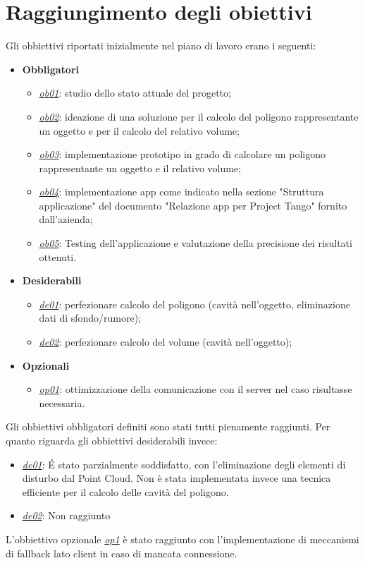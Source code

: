 \newpage
\section{Raggiungimento degli obiettivi}
Gli obbiettivi riportati inizialmente nel piano di lavoro erano i seguenti:
\begin{itemize}
	\item \textbf{Obbligatori}
	\begin{itemize}
		\item \underline{\textit{ob01}}: studio dello stato attuale del progetto;
		\item \underline{\textit{ob02}}: ideazione di una soluzione per il calcolo del poligono rappresentante un oggetto e per il calcolo del relativo volume;
		\item \underline{\textit{ob03}}: implementazione prototipo in grado di calcolare un poligono rappresentante un oggetto e il relativo volume;
		\item \underline{\textit{ob04}}: implementazione app come indicato nella sezione "Struttura applicazione" del documento "Relazione app per Project Tango" fornito dall’azienda;
		\item \underline{\textit{ob05}}: Testing dell’applicazione e valutazione della precisione dei risultati ottenuti.
	\end{itemize}
	
	\item \textbf{Desiderabili}
	\begin{itemize}
		\item \underline{\textit{de01}}: perfezionare calcolo del poligono (cavità nell’oggetto, eliminazione dati di sfondo/rumore);
		\item \underline{\textit{de02}}: perfezionare calcolo del volume (cavità nell’oggetto);
	\end{itemize}
	
	\item \textbf{Opzionali}
	\begin{itemize}
		\item \underline{\textit{op01}}: ottimizzazione della comunicazione con il server nel caso risultasse necessaria.
	\end{itemize} 
\end{itemize}
\noindent 
Gli obbiettivi obbligatori definiti sono stati tutti pienamente raggiunti.
Per quanto riguarda gli obbiettivi desiderabili invece:
\begin{itemize}
	\item \underline{\textit{de01}}: \'E stato parzialmente soddisfatto, con l'eliminazione degli elementi di disturbo dal Point Cloud. Non è stata implementata invece una tecnica efficiente per il calcolo delle cavità del poligono.
	\item \underline{\textit{de02}}: Non raggiunto
\end{itemize}
\noindent
L'obbiettivo opzionale \underline{\textit{op1}} è stato raggiunto con l'implementazione di meccanismi di fallback lato client in caso di mancata connessione.

